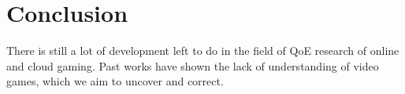 \section{Conclusion}
\label{sec:conclusion}

There is still a lot of development left to do in the field of \gls{QoE} research of online and cloud gaming. Past works have shown the lack of understanding of video games, which we aim to uncover and correct.




